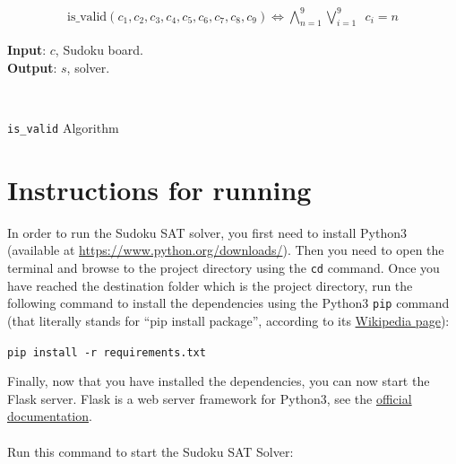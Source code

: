 \documentclass[]{usiinfprospectus}
\newcounter{row}
\begin{document}
\begin{align*}
\text{is\_valid}\left(  c_1,  c_2,  c_3,  c_4,  c_5,  c_6,  c_7,  c_8,  c_9
	\right) \Leftrightarrow \bigwedge^9_{n=1}  \bigvee^9_{i=1} \,\,\, c_i = n
\end{align*}

\begin{algorithm}[H]
\hspace*{\algorithmicindent} \textbf{Input}: $c$, Sudoku board. \\
\hspace*{\algorithmicindent} \textbf{Output}: $s$, solver.
\begin{algorithmic}[1]\label{algorithm:}
 
\Else
{}
\EndIf
\EndFor
{}
\EndFor
{}
\EndFor\\
\EndFunction
\end{algorithmic}
	\caption {\texttt{is\_valid} Algorithm}
\end{algorithm}

\newpage
\section{Instructions for running}

In order to run the Sudoku SAT solver, you first need to install Python3
(available at \url{https://www.python.org/downloads/}). Then you need to open
the terminal and browse to the project directory using the \texttt{cd} command.
Once you have reached the destination folder which is the project directory, run
the following command to install the dependencies using the Python3 \texttt{pip}
command (that literally stands for ``pip install package'', according to its
\href{https://en.wikipedia.org/wiki/Pip\_(package\_manager)}{Wikipedia page}):

\begin{center}
\texttt{pip install -r requirements.txt}
\end{center}

\noindent Finally, now that you have installed the dependencies, you can now
start the Flask server. Flask is a web server framework for Python3, see the
\href{https://flask.palletsprojects.com/}{official documentation}.\\ \\ Run this
command to start the Sudoku SAT Solver:
\end{document}
